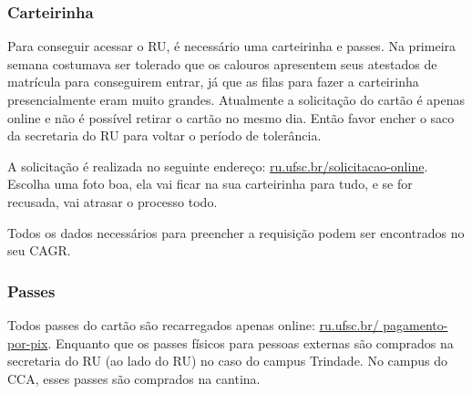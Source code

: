\subsubsection{Carteirinha} Para conseguir acessar o RU, é necessário uma carteirinha e passes.
Na primeira semana costumava ser tolerado que os calouros apresentem seus atestados de matrícula para conseguirem entrar, já que as filas para fazer a carteirinha presencialmente eram muito grandes.
Atualmente a solicitação do cartão é apenas online e não é possível retirar o cartão no mesmo dia.
Então favor encher o saco da secretaria do RU para voltar o período de tolerância.

A solicitação é realizada no seguinte endereço: \href{https://ru.ufsc.br/solicitacao-online/}{ru.ufsc.br/solicitacao-online}.
Escolha uma foto boa, ela vai ficar na sua carteirinha para tudo, e se for recusada, vai atrasar o processo todo.

Todos os dados necessários para preencher a requisição podem ser encontrados no seu CAGR.

\subsubsection{Passes} 
Todos passes do cartão são recarregados apenas online: \href{https://ru.ufsc.br/pagamento-por-pix/}{ru.ufsc.br/ pagamento-por-pix}.
Enquanto que os passes físicos para pessoas externas são comprados na secretaria do RU (ao lado do RU) no caso do campus Trindade. No campus do CCA, esses passes são comprados na cantina.
